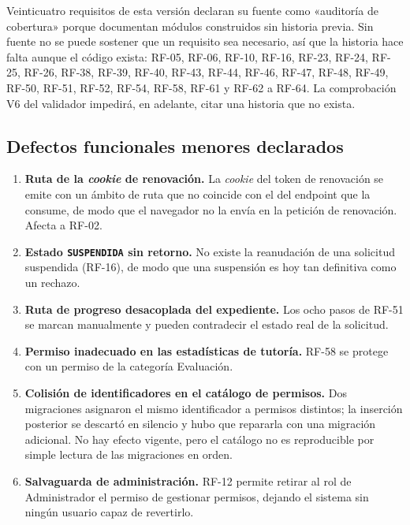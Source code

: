 \documentclass[11pt,a4paper]{article}
\begin{document}
Veinticuatro requisitos de esta versión declaran su fuente como «auditoría de cobertura» porque
documentan módulos construidos sin historia previa. Sin fuente no se puede sostener que un
requisito sea necesario, así que la historia hace falta aunque el código exista: RF-05, RF-06,
RF-10, RF-16, RF-23, RF-24, RF-25, RF-26, RF-38, RF-39, RF-40, RF-43, RF-44, RF-46, RF-47,
RF-48, RF-49, RF-50, RF-51, RF-52, RF-54, RF-58, RF-61 y RF-62 a RF-64. La comprobación V6 del
validador impedirá, en adelante, citar una historia que no exista.

\subsection{Defectos funcionales menores declarados}

\begin{enumerate}
    \item \textbf{Ruta de la \emph{cookie} de renovación.} La \emph{cookie} del token de
          renovación se emite con un ámbito de ruta que no coincide con el del endpoint que la
          consume, de modo que el navegador no la envía en la petición de renovación. Afecta a
          RF-02.
    \item \textbf{Estado \texttt{SUSPENDIDA} sin retorno.} No existe la reanudación de una
          solicitud suspendida (RF-16), de modo que una suspensión es hoy tan definitiva como un
          rechazo.
    \item \textbf{Ruta de progreso desacoplada del expediente.} Los ocho pasos de RF-51 se marcan
          manualmente y pueden contradecir el estado real de la solicitud.
    \item \textbf{Permiso inadecuado en las estadísticas de tutoría.} RF-58 se protege con un
          permiso de la categoría Evaluación.
    \item \textbf{Colisión de identificadores en el catálogo de permisos.} Dos migraciones
          asignaron el mismo identificador a permisos distintos; la inserción posterior se
          descartó en silencio y hubo que repararla con una migración adicional. No hay efecto
          vigente, pero el catálogo no es reproducible por simple lectura de las migraciones en
          orden.
    \item \textbf{Salvaguarda de administración.} RF-12 permite retirar al rol de Administrador
          el permiso de gestionar permisos, dejando el sistema sin ningún usuario capaz de
          revertirlo.
\end{enumerate}
\end{document}
